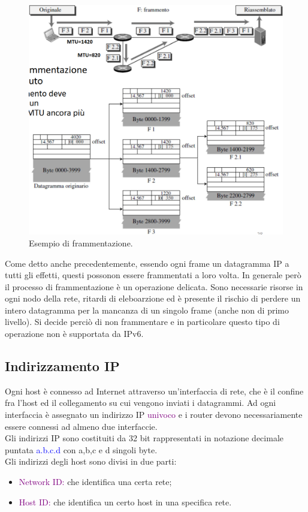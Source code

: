 \begin{figure}[h]
    \centering
    \includegraphics[scale=0.33]{Immagini/FrammentazioneIP.png}
    \caption{Esempio di frammentazione.}
\end{figure}

Come detto anche precedentemente, essendo ogni frame un datagramma IP a tutti gli effetti, questi possonon essere frammentati a loro volta.
\newpage 
In generale però il processo di frammentazione è un operazione delicata. Sono necessarie risorse in ogni nodo della rete, ritardi di eleboarzione ed è presente il rischio di perdere un intero datagramma per la mancanza di un singolo frame (anche non di primo livello).
Si decide perciò di non frammentare e in particolare questo tipo di operazione non è supportata da IPv6.

\subsection{Indirizzamento IP}
Ogni host è connesso ad Internet attraverso un'interfaccia di rete, che è il confine fra l'host ed il collegamento su cui vengono inviati i datagrammi.
Ad ogni interfaccia è assegnato un indirizzo IP \textcolor{purple}{univoco} e i router devono necessariamente essere connessi ad almeno due interfaccie.
\\Gli indirizzi IP sono costituiti da 32 bit rappresentati in notazione decimale puntata \textcolor{blue}{a.b.c.d} con a,b,c e d singoli byte.
\\Gli indirizzi degli host sono divisi in due parti:
\begin{itemize}
    \item \textcolor{purple}{Network ID:} che identifica una certa rete;
    \item \textcolor{purple}{Host ID:} che identifica un certo host in una specifica rete.
\end{itemize}

